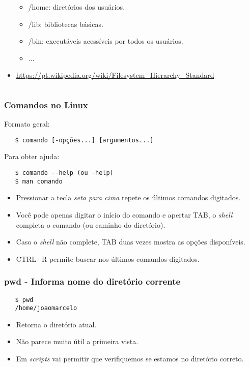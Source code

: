 \documentclass{beamer}
\begin{document}
\begin{frame}
\begin{columns}
\begin{column}{0.6\textwidth}
\begin{itemize}
\begin{itemize}
	    \item /home: diretórios dos usuários.
	    \item /lib: bibliotecas básicas.
	    \item /bin: executáveis acessíveis por todos os usuários.
	    \item ...
	 \end{itemize}
	 \item \url{https://pt.wikipedia.org/wiki/Filesystem_Hierarchy_Standard}
      \end{itemize}
      \end{column}
      \end{columns}
   \end{frame}

\begin{frame}[fragile]
   \frametitle{Comandos no Linux}
   Formato geral: 
   \begin{verbatim}
   $ comando [-opções...] [argumentos...] 
   \end{verbatim}
   Para obter ajuda:
   \begin{verbatim}
   $ comando --help (ou -help)
   $ man comando
   \end{verbatim}
   \begin{itemize}
      \item Pressionar a tecla \textit{seta para cima} repete os últimos comandos digitados.
      \item Você pode apenas digitar o início do comando e apertar TAB, o \textit{shell} completa o comando (ou caminho do diretório).
      \item Caso o \textit{shell} não complete, TAB duas vezes mostra as opções disponíveis.
      \item CTRL+R permite buscar nos últimos comandos digitados.
   \end{itemize}
\end{frame}

\begin{frame}[fragile]
   \frametitle{pwd - Informa nome do diretório corrente}
   \begin{verbatim}
   $ pwd 
   /home/joaomarcelo 
   \end{verbatim}
   \begin{itemize}
      \item Retorna o diretório atual.
      \item Não parece muito útil a primeira vista.
      \item Em \textit{scripts} vai permitir que verifiquemos se estamos no diretório correto.
   \end{itemize}
\end{frame}
\end{document}
